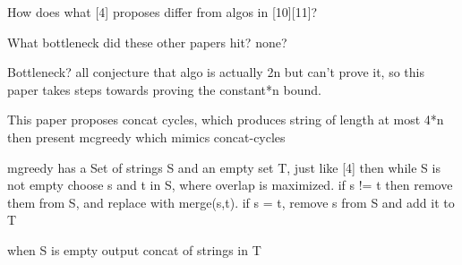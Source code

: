 \documentclass[letterpaper,twocolumn,11pt]{article}
\begin{document}
How does what [4] proposes differ from algos in [10][11]?

What bottleneck did these other papers hit?
none?

Bottleneck?  all conjecture that algo is actually 2n but can't prove it, so this paper
takes steps towards proving the constant*n bound.

This paper proposes concat cycles, which produces string of length at most 4*n
then present mcgreedy which mimics concat-cycles

mgreedy has a Set of strings S and an empty set T, just like [4]
then while S is not empty choose s and t in S, where overlap is maximized.  if s != t
then remove them from S, and replace with merge(s,t).  if s = t, remove s from S and add it to T

when S is empty output concat of strings in T


{
  \small 
  
  
}
\end{document}
